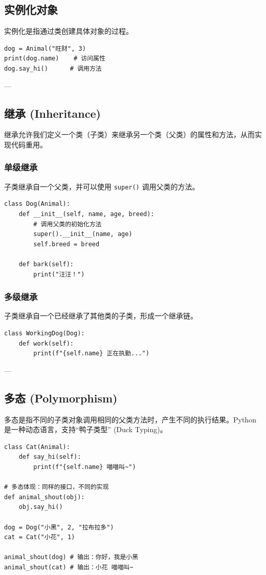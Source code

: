 \documentclass{article}
\begin{document}
\subsection{实例化对象}
实例化是指通过类创建具体对象的过程。

\begin{lstlisting}
dog = Animal("旺财", 3)
print(dog.name)    # 访问属性
dog.say_hi()      # 调用方法
\end{lstlisting}

---

\subsection{继承 (Inheritance)}

继承允许我们定义一个类（子类）来继承另一个类（父类）的属性和方法，从而实现代码重用。

\subsubsection{单级继承}
子类继承自一个父类，并可以使用 \texttt{super()} 调用父类的方法。

\begin{lstlisting}
class Dog(Animal):
    def __init__(self, name, age, breed):
        # 调用父类的初始化方法
        super().__init__(name, age)
        self.breed = breed

    def bark(self):
        print("汪汪！")
\end{lstlisting}

\subsubsection{多级继承}
子类继承自一个已经继承了其他类的子类，形成一个继承链。

\begin{lstlisting}
class WorkingDog(Dog):
    def work(self):
        print(f"{self.name} 正在执勤...")
\end{lstlisting}

---

\subsection{多态 (Polymorphism)}

多态是指不同的子类对象调用相同的父类方法时，产生不同的执行结果。Python 是一种动态语言，支持“鸭子类型” (Duck Typing)。

\begin{lstlisting}
class Cat(Animal):
    def say_hi(self):
        print(f"{self.name} 喵喵叫~")

# 多态体现：同样的接口，不同的实现
def animal_shout(obj):
    obj.say_hi()

dog = Dog("小黑", 2, "拉布拉多")
cat = Cat("小花", 1)

animal_shout(dog) # 输出：你好，我是小黑
animal_shout(cat) # 输出：小花 喵喵叫~
\end{lstlisting}
\end{document}

